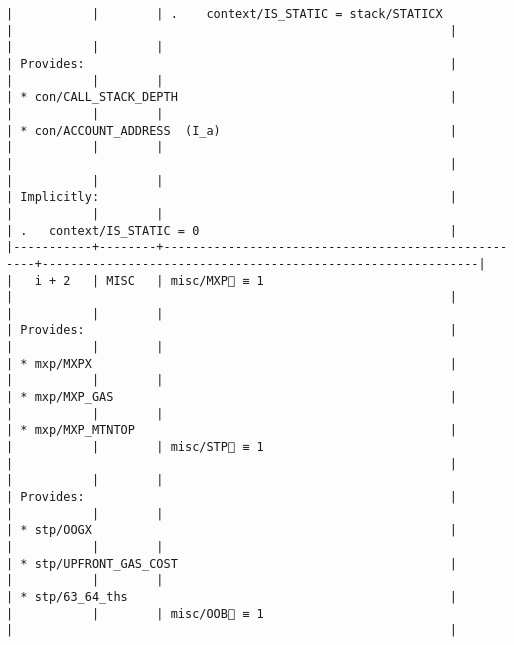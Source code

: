 \documentclass[varwidth=\maxdimen,margin=0.5cm,multi={verbatim}]{standalone}
\begin{document}
\begin{verbatim}
|           |        | .    context/IS_STATIC = stack/STATICX             |                                                             |
|           |        |                                                    | Provides:                                                   |
|           |        |                                                    | * con/CALL_STACK_DEPTH                                      |
|           |        |                                                    | * con/ACCOUNT_ADDRESS  (I_a)                                |
|           |        |                                                    |                                                             |
|           |        |                                                    | Implicitly:                                                 |
|           |        |                                                    | .   context/IS_STATIC = 0                                   |
|-----------+--------+----------------------------------------------------+-------------------------------------------------------------|
|   i + 2   | MISC   | misc/MXP🚩 ≡ 1                                     |                                                             |
|           |        |                                                    | Provides:                                                   |
|           |        |                                                    | * mxp/MXPX                                                  |
|           |        |                                                    | * mxp/MXP_GAS                                               |
|           |        |                                                    | * mxp/MXP_MTNTOP                                            |
|           |        | misc/STP🚩 ≡ 1                                     |                                                             |
|           |        |                                                    | Provides:                                                   |
|           |        |                                                    | * stp/OOGX                                                  |
|           |        |                                                    | * stp/UPFRONT_GAS_COST                                      |
|           |        |                                                    | * stp/63_64_ths                                             |
|           |        | misc/OOB🚩 ≡ 1                                     |                                                             |

\end{verbatim}
\end{document}
